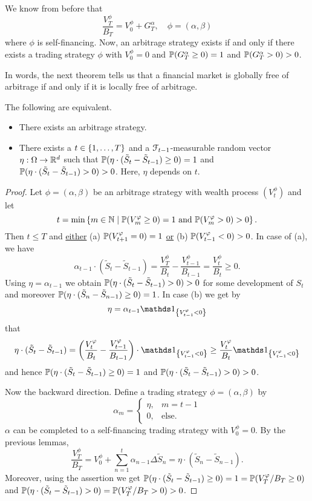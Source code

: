 \documentclass[12pt]{amsart}
\begin{document}
We know from before that \[
    \frac{V_T^\phi}{B_T} = V_0^\phi + G_T^\alpha, \quad \phi = (\alpha, \beta)
\]
where \(\phi\) is self-financing. Now, an arbitrage strategy exists if and only if there exists a trading strategy \(\phi\) with \(V_0^\phi = 0\) and \(\P(G_T^\alpha \geq 0) = 1\) and \(\P(G_T^\alpha > 0) > 0\).

In words, the next theorem tells us that a financial market is globally free of arbitrage if and only if it is locally free of arbitrage.

\begin{theorem}{}{}{}
    The following are equivalent.
    \begin{itemize}
        \item There exists an arbitrage strategy.
        \item There exists a \(t \in \set{1, \dots, T}\) and a \(\cF_{t-1}\)-measurable random vector \(\eta: \Omega \to \R^{d}\) such that \(\P(\eta \cdot (\tilde{S}_t - \tilde{S}_{t-1}) \geq 0) = 1\) and \(\P(\eta \cdot (\tilde{S}_t - \tilde{S}_{t-1}) > 0) > 0\). Here, \(\eta\) depends on \(t\).
    \end{itemize}
\end{theorem}
\begin{proof}
    Let \(\phi = (\alpha, \beta)\) be an arbitrage strategy with wealth process \((V_t^\phi)\) and let \[
        t = \min\set{m \in \N \mid \P(V_m^\phi \geq 0) = 1 \text{ and } \P(V_m^\phi > 0) > 0}.
    \]
    Then \(t \leq T\) and \underline{either} (a) \(\P(V_{t+1}^\phi = 0) = 1\) \underline{or} (b) \(\P(V_{t-1}^\phi < 0) > 0\). In case of (a), we have \[
        \alpha_{t-1} \cdot (\tilde{S}_t - \tilde{S}_{t-1}) = \frac{V_T^\phi}{B_t} - \frac{V_{t-1}^\phi}{B_{t-1}} = \frac{V_t^\phi}{B_t} \geq 0.
    \]
    Using \(\eta = \alpha_{t-1}\) we obtain \(\P(\eta \cdot (\tilde{S}_t - \tilde{S}_{t-1}) > 0) > 0\) for some development of \(S_t\) and moreover \(\P(\eta \cdot (\tilde{S}_n - \tilde{S}_{n-1}) \geq 0) = 1\). In case (b) we get by \[
        \eta = \alpha_{t-1} \indic[V_{t-1}^\phi < 0]
    \]
    that \[
        \eta \cdot (\tilde{S}_t - \tilde{S}_{t-1}) = \left(\frac{V_t^\phi}{B_t} - \frac{V_{t-1}^\phi}{B_{t-1}}\right) \cdot \indic[V_{t-1}^\phi < 0] \geq \frac{V_t^\phi}{B_t} \indic[V_{t-1}^\phi < 0]
    \]
    and hence \(\P(\eta \cdot (\tilde{S}_t - \tilde{S}_{t-1}) \geq 0) = 1\) and \(\P(\eta \cdot (\tilde{S}_t - \tilde{S}_{t-1}) > 0) > 0\).

    Now the backward direction. Define a trading strategy \(\phi = (\alpha, \beta)\) by \[
        \alpha_m = \begin{cases}
            \eta, &m=t-1\\
            0, &\text{else}.
        \end{cases}
    \]
    \(\alpha\) can be completed to a self-financing trading strategy  with \(V_0^\phi = 0\). By the previous lemmas, \[
        \frac{V_T^\phi}{B_T} = V_0^\phi + \sum_{n=1}^t \alpha_{n-1}\Delta \tilde{S}_n = \eta \cdot (\tilde{S}_n - \tilde{S}_{n-1}).
    \]
    Moreover, using the assertion we get \(\P(\eta \cdot (\tilde{S}_t - \tilde{S}_{t-1}) \geq 0) = 1 = \P(V_T^\phi/B_T \geq 0)\) and \(\P(\eta \cdot (\tilde{S}_t - \tilde{S}_{t-1}) > 0) = \P(V_T^\phi/B_T > 0) > 0\).
\end{proof}
\end{document}
